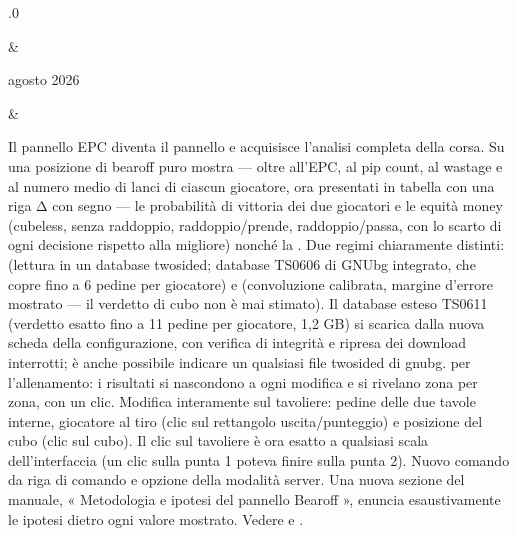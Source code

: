 \documentclass[letterpaper,10pt,italian]{sphinxmanual}
\begin{document}
\begin{savenotes}
\begin{longtable}{}
\begin{varwidth}[t]{}
.0
\sphinxbeforeendvarwidth
\end{varwidth}%
&\begin{varwidth}[t]{}
 agosto 2026
\sphinxbeforeendvarwidth
\end{varwidth}%
&\begin{varwidth}[t]{}
\sphinxAtStartPar
Il pannello EPC diventa il pannello  e acquisisce l’analisi completa della corsa. Su una posizione di bearoff puro mostra — oltre all’EPC, al pip count, al wastage e al numero medio di lanci di ciascun giocatore, ora presentati in tabella con una riga Δ con segno — le probabilità di vittoria dei due giocatori e le equità money (cubeless, senza raddoppio, raddoppio/prende, raddoppio/passa, con lo scarto di ogni decisione rispetto alla migliore) nonché la . Due regimi chiaramente distinti:  (lettura in un database two\sphinxhyphen{}sided; database TS\sphinxhyphen{}06\sphinxhyphen{}06 di GNUbg integrato, che copre fino a 6 pedine per giocatore) e  (convoluzione calibrata, margine d’errore mostrato — il verdetto di cubo non è mai stimato). Il database esteso TS\sphinxhyphen{}06\sphinxhyphen{}11 (verdetto esatto fino a 11 pedine per giocatore, 1,2 GB) si scarica dalla nuova scheda  della configurazione, con verifica di integrità e ripresa dei download interrotti; è anche possibile indicare un qualsiasi file  two\sphinxhyphen{}sided di gnubg.  per l’allenamento: i risultati si nascondono a ogni modifica e si rivelano zona per zona, con un clic. Modifica interamente sul tavoliere: pedine delle due tavole interne, giocatore al tiro (clic sul rettangolo uscita/punteggio) e posizione del cubo (clic sul cubo). Il clic sul tavoliere è ora esatto a qualsiasi scala dell’interfaccia (un clic sulla punta 1 poteva finire sulla punta 2). Nuovo comando  da riga di comando e opzione  della modalità server. Una nuova sezione del manuale, « Metodologia e ipotesi del pannello Bearoff », enuncia esaustivamente le ipotesi dietro ogni valore mostrato. Vedere {\hyperref[\detokenize{manuel:panneau-epc}]{}} e {\hyperref[\detokenize{manuel:epc-methodologie}]{}}.
\sphinxbeforeendvarwidth
\end{varwidth}%
\\
\sphinxbottomrule
\end{longtable}
\sphinxtableafterendhook
\sphinxatlongtableend
\end{savenotes}
\end{document}
